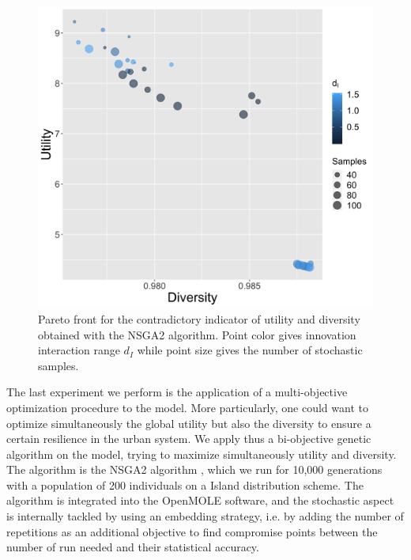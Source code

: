 \documentclass[letterpaper]{article}
\begin{document}
\begin{figure}[t]
	\centering
	\includegraphics[width=\linewidth]{figures/paretoDiversity-Utility_colorinnovationDecay.png}
	\caption{Pareto front for the contradictory indicator of utility and diversity obtained with the NSGA2 algorithm. Point color gives innovation interaction range $d_I$ while point size gives the number of stochastic samples.\label{fig:pareto}}
\end{figure}

The last experiment we perform is the application of a multi-objective optimization procedure to the model. More particularly, one could want to optimize simultaneously the global utility but also the diversity to ensure a certain resilience in the urban system. We apply thus a bi-objective genetic algorithm on the model, trying to maximize simultaneously utility and diversity. The algorithm is the NSGA2 algorithm \citep{deb2002fast}, which we run for 10,000 generations with a population of 200 individuals on a Island distribution scheme. The algorithm is integrated into the OpenMOLE software, and the stochastic aspect is internally tackled by using an embedding strategy, i.e. by adding the number of repetitions as an additional objective to find compromise points between the number of run needed and their statistical accuracy.
\end{document}
